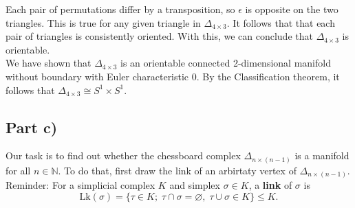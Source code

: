 \documentclass[11pt,a4paper]{article}
\theoremstyle{plain}
\theoremstyle{definition}
\theoremstyle{remark}
\newcommand{\N}{\mathbb{N}}
\newcommand{\pair}[9]{%
\begin{scope}[shift={(#1,#2)}]
  \coordinate (P) at (0,1.2);  \coordinate (Q) at (0,-1.2);
  \coordinate (L) at (-2.2,0); \coordinate (R) at (2.2,0);
  \fill[red!15]  (P)--(Q)--(L)--cycle;
  \fill[blue!15] (P)--(Q)--(R)--cycle;
  \draw (P)--(L)--(Q)--(R)--cycle;
  \draw[very thick] (P)--(Q);
  \foreach \p in {P,Q,L,R} \fill (\p) circle (2pt);
  \node[above]  at (P) {#3};
  \node[below]  at (Q) {#4};
  \node[left]   at (L) {#5};
  \node[right]  at (R) {#6};
  \draw[->,red!70!black]  (-0.7,0) arc[start angle=0,end angle=#7,radius=0.3];
  \draw[->,blue!70!black] ( 1.3,0) arc[start angle=0,end angle=#8,radius=0.3];
  \node[align=left,anchor=west] at (3.6,0) {#9};
\end{scope}}
\begin{document}
\begin{figure}[H]
\centering
{}
\end{figure}

\vspace*{15px}

\noindent
Each pair of permutations differ by a transposition, so $\epsilon$ is opposite on the two triangles. This is true for any given triangle in $\Delta_{4 \times 3}$. It follows that that each pair of triangles
is consistently oriented. With this, we can conclude that $\Delta_{4 \times 3}$ is orientable. \\

\noindent
We have shown that $\Delta_{4 \times 3}$  is an orientable connected 2-dimensional manifold without boundary with Euler characteristic 0.
By the Classification theorem, it follows that $\Delta_{4 \times 3} \cong S^1 \times S^1$.


\subsection{Part c)}

Our task is to find out whether the chessboard complex $\Delta_{n \times (n-1)}$ is a manifold for all $n \in \N$.
To do that, first draw the link of an arbirtaty vertex of $\Delta_{n \times (n-1)}$. Reminder: For a simplicial complex $K$ and simplex $\sigma \in K$,
a \textbf{link} of $\sigma$ is
$$\text{Lk}(\sigma) = \{\tau \in K; \; \tau \cap \sigma = \varnothing, \; \tau \cup \sigma \in K\} \leq K.$$

\end{document}
